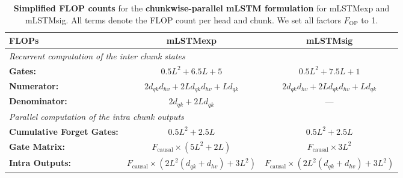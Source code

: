 \documentclass{article}
\begin{document}
    \begin{table}[htbp]
        \vspace{-0.3cm}
        \centering
        \caption{\label{tab:simpl_flop_counts_mlstm_chunkwise} \textbf{Simplified FLOP counts} for the \textbf{chunkwise-parallel mLSTM formulation} for mLSTMexp and mLSTMsig.
            All terms denote the FLOP count per head and chunk. We set all factors $F_\text{OP}$ to 1.}
        \vspace{0.2cm}
        \begin{adjustbox}{width=\textwidth}
        \begin{tabular}{lcc}
            \toprule
            FLOPs                             & mLSTMexp                                                            & mLSTMsig                                                            \\
            \midrule
            \multicolumn{3}{l}{\textit{Recurrent computation of the inter chunk states}}                                                                                                  \\
            \textbf{Gates:}                   & $0.5 L^2 + 6.5L + 5$                                                & $0.5 L^2 + 7.5L + 1$                                                \\
            \textbf{Numerator:}               & $2d_{qk} d_{hv} + 2L d_{qk} d_{hv} + L d_{qk}$                      & $2d_{qk} d_{hv} + 2L d_{qk} d_{hv} + L d_{qk}$                      \\
            \textbf{Denominator:}             & $2d_{qk} + 2L d_{qk}$                                               & ---                                                                 \\
            \midrule
            \multicolumn{3}{l}{\textit{Parallel computation of the intra chunk outputs}}                                                                                                  \\
            \textbf{Cumulative Forget Gates:} & $0.5 L^2 + 2.5L$                                                    & $0.5 L^2 + 2.5L$                                                    \\
            \textbf{Gate Matrix:}             & $F_\text{causal} \times \left( 5L^2 + 2L \right)$                   & $F_\text{causal} \times  3L^2$                                      \\
            \textbf{Intra Outputs:}           & $F_\text{causal} \times \left( 2L^2(d_{qk} + d_{hv}) + 3L^2\right)$ & $F_\text{causal} \times \left( 2L^2(d_{qk} + d_{hv}) + 3L^2\right)$ \\

\end{tabular}
\end{adjustbox}
\end{table}
\end{document}
